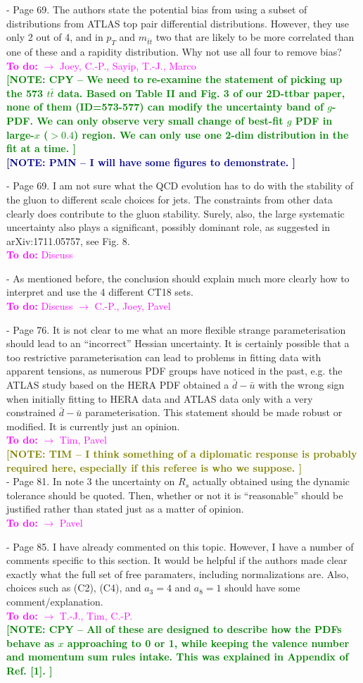 \documentclass[aps,prd,amsmath,nofootinbib,floatfix,fleqn]{revtex4}
\newcommand{\TODO}[1]{\textcolor{magenta}{
\quad\vspace{3pt} \\ {\bf To do:} #1 \\
}}
\newcommand{\NOTECPY}[1]{\textcolor{green}{ \bf[NOTE: CPY -- #1 ]}}
\newcommand{\NOTEPN}[1]{\textcolor{darkblue}{ \bf[NOTE: PMN -- #1 ]}}
\newcommand{\NOTETIM}[1]{\textcolor{olive}{ \bf[NOTE: TIM -- #1 ]}}
\begin{document}
- Page 69. The authors state the potential bias from using a subset of
distributions from ATLAS top pair differential distributions. However, they use only 2 out of 4, and in $p_T$ and $m_{\bar t t}$ two that are likely to be more
correlated than one of these and a rapidity distribution. Why not use all four
to remove bias?
\TODO{$\to$ Joey, C.-P., Sayip, T.-J., Marco}
\NOTECPY{We need to re-examine the statement of picking up the 573 $t \bar t$ data. Based on Table II and Fig. 3 of our 2D-ttbar paper, none of them (ID=573-577) can modify the uncertainty band of $g$-PDF. We can only observe very small change of best-fit $g$ PDF in large-$x$ ($> 0.4$) region. We can only use one 2-dim distribution in the fit at a time.}\\
\NOTEPN{I will have some figures to demonstrate.}


- Page 69. I am not sure what the QCD evolution has to do with the stability of
the gluon to different scale choices for jets. The constraints from other data
clearly does contribute to the gluon stability. Surely, also, the large
systematic uncertainty also plays a significant, possibly dominant role, as
suggested in arXiv:1711.05757, see Fig. 8.
\TODO{Discuss}

- As mentioned before, the conclusion should explain much more clearly how to
interpret and use the 4 different CT18 sets.
\TODO{Discuss $\to$ C.-P., Joey, Pavel}

- Page 76. It is not clear to me what an more flexible strange parameterisation
should lead to an ``incorrect'' Hessian uncertainty. It is certainly possible
that a too restrictive parameterisation can lead to problems in fitting data
with apparent tensions, as numerous PDF groups have noticed in the past, e.g.
the ATLAS study based on the HERA PDF obtained a $\bar d -\bar u$ with the wrong sign when initially fitting to HERA data and ATLAS data only with a very
constrained $\bar d -\bar u$ parameterisation. This statement should be made robust or modified. It is currently just an opinion.
%
\TODO{$\to$ Tim, Pavel}
%
\NOTETIM{I think something of a diplomatic response is probably required here, especially
if this referee is who we suppose.}\\

- Page 81. In note 3 the uncertainty on $R_s$ actually obtained using the
dynamic tolerance should be quoted. Then, whether or not it is ``reasonable''
should be justified rather than stated just as a matter of opinion.
\TODO{$\to$ Pavel}

- Page 85. I have already commented on this topic. However, I have a number of
comments specific to this section. It would be helpful if the authors made clear
exactly what the full set of free paramaters, including normalizations are.
Also, choices such as (C2), (C4), and $a_3=4$ and $a_8=1$ should have some
comment/explanation.
\TODO{$\to$ T.-J., Tim, C.-P.}
\NOTECPY{All of these are designed to describe how the PDFs behave as $x$ approaching to  0 or 1, while keeping the valence number and momentum sum rules intake. This was explained in Appendix of Ref. [1].}\\
\end{document}
